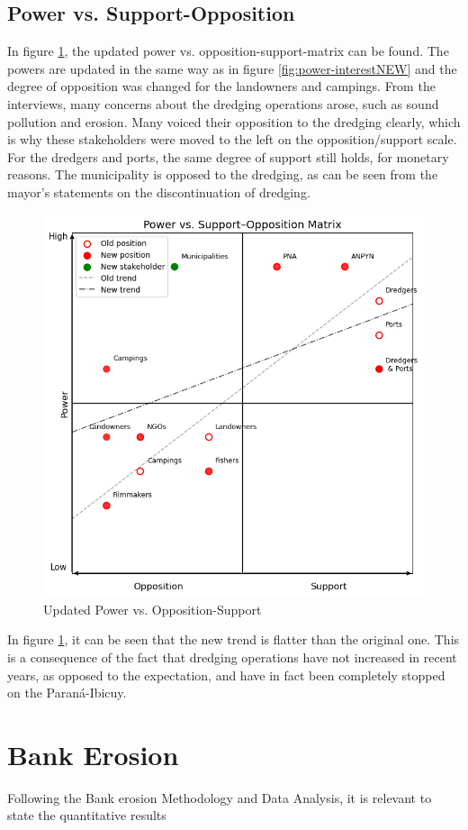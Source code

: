 \subsection{Power vs. Support-Opposition}
In figure \ref{fig:power-supportNEW}, the updated power vs. opposition-support-matrix can be found. The powers are updated in the same way as in figure \ref{fig:power-interestNEW} and the degree of opposition was changed for the landowners and campings. From the interviews, many concerns about the dredging operations arose, such as sound pollution and erosion. Many voiced their opposition to the dredging clearly, which is why these stakeholders were moved to the left on the opposition/support scale. For the dredgers and ports, the same degree of support still holds, for monetary reasons. The municipality is opposed to the dredging, as can be seen from the mayor's statements on the discontinuation of dredging.

\begin{figure}[H]
    \centering
    \includegraphics[width=0.70\linewidth]{figures/ch3/NewPowerVSSupport.png}
    \caption{Updated Power vs. Opposition-Support}
    \label{fig:power-supportNEW}
\end{figure}

In figure \ref{fig:power-supportNEW}, it can be seen that the new trend is flatter than the original one. This is a consequence of the fact that dredging operations have not increased in recent years, as opposed to the expectation, and have in fact been completely stopped on the Paraná-Ibicuy.

\section{Bank Erosion}

Following the Bank erosion Methodology and Data Analysis, it is relevant to state the quantitative results